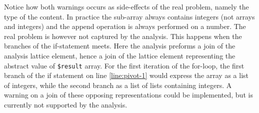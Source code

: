 Notice how both warnings occurs as side-effects of the real problem, namely the type of the content. In practice the sub-array always contains integers (not arrays and integers) and the append operation is always performed on a number. The real problem is however not captured by the analysis. This happens when the branches of the if-statement meets. Here the analysis preforms a join of the analysis lattice element, hence a join of the lattice element representing the abstract value of \texttt{\$result} array. For the first iteration of the for-loop, the first branch of the if statement on line \ref{line:pivot-1} would express the array as a list of integers, while the second branch as a list of lists containing integers. A warning on a join of these opposing representations could be implemented, but is currently not supported by the analysis.




